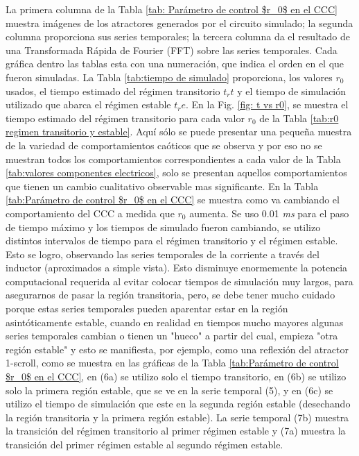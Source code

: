 \documentclass{rbf}
\begin{document}
La primera columna de la Tabla \ref{tab: Parámetro de control $r_0$ en el CCC} muestra imágenes de los atractores generados por el circuito simulado; la segunda columna proporciona sus series temporales; la tercera columna da el resultado de una Transformada Rápida de Fourier (FFT) sobre las series temporales. Cada gráfica dentro las tablas esta con una  numeración, que indica el orden en el que fueron simuladas. La Tabla \ref{tab:tiempo de simulado} proporciona, los valores $r_0$ usados, el tiempo estimado del régimen transitorio $t_rt$ y el tiempo de simulación utilizado que abarca el régimen estable $t_re$. En la Fig. \ref{fig: t vs r0}, se muestra el tiempo estimado del régimen transitorio para cada valor $r_0$ de la Tabla \ref{tab:r0 regimen transitorio y estable}.
Aquí sólo se puede presentar una pequeña muestra de la variedad de comportamientos caóticos que se observa y por eso no se muestran todos los comportamientos correspondientes a cada valor de la Tabla \ref{tab:valores componentes electricos}, solo se presentan aquellos comportamientos que tienen un cambio cualitativo observable mas significante. En la Tabla \ref{tab:Parámetro de control $r_0$ en el CCC} se muestra como va cambiando el comportamiento del CCC a medida que $r_0$ aumenta.
Se uso 0.01 \textit{ms} para el paso de tiempo máximo y los tiempos de simulado fueron cambiando, se utilizo distintos intervalos de tiempo para el régimen transitorio y el régimen estable. Esto se logro, observando las series temporales de la corriente a través del inductor (aproximados a simple vista). 
Esto disminuye enormemente la potencia computacional requerida al evitar colocar tiempos de simulación muy largos, para asegurarnos de pasar la región transitoria, pero, se debe tener mucho cuidado porque estas series temporales pueden aparentar estar en la región asintóticamente estable, cuando en realidad en tiempos mucho mayores algunas series temporales cambian o tienen un "hueco" a partir del cual, empieza "otra región estable" y esto se manifiesta, por ejemplo, como una reflexión del atractor 1-scroll, como se muestra en las gráficas de la Tabla \ref{tab:Parámetro de control $r_0$ en el CCC}, en (6a) se utilizo solo el tiempo transitorio, en (6b) se utilizo solo la primera región estable, que se ve en la serie temporal (5), y en (6c) se utilizo el tiempo de simulación que este en la segunda región estable (desechando la región transitoria y la primera región estable).
La serie temporal (7b) muestra la transición del régimen transitorio al primer régimen estable y (7a) muestra la transición del primer régimen estable al segundo régimen estable.
\end{document}
